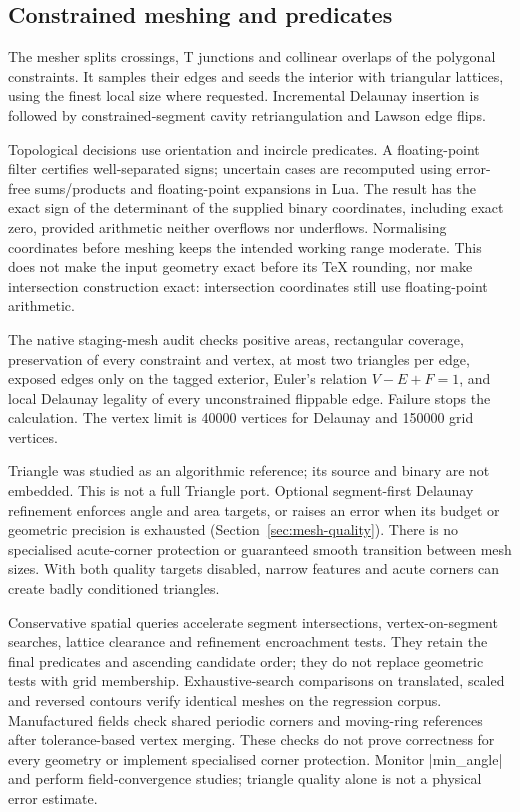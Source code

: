\subsection{Constrained meshing and predicates}
The mesher splits crossings, T junctions and collinear overlaps of the
polygonal constraints. It samples their edges and seeds the interior
with triangular lattices, using the finest local size where requested.
Incremental Delaunay insertion is followed by constrained-segment cavity
retriangulation and Lawson edge flips.

Topological decisions use orientation and incircle predicates. A
floating-point filter certifies well-separated signs; uncertain cases
are recomputed using error-free sums/products and floating-point
expansions in Lua. The result has the exact sign of the determinant of
the supplied binary coordinates, including exact zero, provided arithmetic
neither overflows nor underflows. Normalising coordinates before meshing
keeps the intended working range moderate. This does not make the input
geometry exact before its TeX rounding, nor make intersection construction
exact: intersection coordinates still use floating-point arithmetic.

The native staging-mesh audit checks positive areas, rectangular coverage, preservation
of every constraint and vertex, at most two triangles per edge, exposed
edges only on the tagged exterior, Euler's relation $V-E+F=1$, and local
Delaunay legality of every unconstrained flippable edge. Failure stops
the calculation. The vertex limit is 40000 vertices for Delaunay and
150000 grid vertices.

Triangle was studied as an algorithmic reference; its source and binary
are not embedded. This is not a full Triangle port. Optional segment-first
Delaunay refinement enforces angle and area targets, or raises an error
when its budget or geometric precision is exhausted (Section~\ref{sec:mesh-quality}).
There is no specialised acute-corner protection or guaranteed smooth
transition between mesh sizes. With both quality targets disabled, narrow
features and acute corners can create badly conditioned triangles.

Conservative spatial queries accelerate segment intersections, vertex-on-segment
searches, lattice clearance and refinement encroachment tests. They retain the
final predicates and ascending candidate order; they do not replace geometric
tests with grid membership. Exhaustive-search comparisons on translated, scaled
and reversed contours verify identical meshes on the regression corpus.
Manufactured fields check shared periodic corners and moving-ring references
after tolerance-based vertex merging. These checks do not prove correctness for
every geometry or implement specialised corner protection.
Monitor |min_angle| and perform field-convergence studies; triangle quality
alone is not a physical error estimate.

